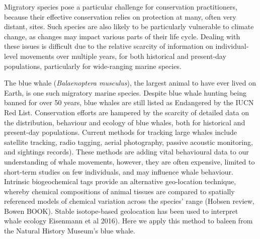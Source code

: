 \documentclass[a4paper,12pt]{article}
\begin{document}
Migratory species pose a particular challenge for conservation practitioners, because their effective conservation relies on protection at many, often very distant, sites\cite{runge2014conserving}. 
Such species are also likely to be particularly vulnerable to climate change, as changes may impact various parts of their life cycle\cite{robinson2009travelling}. 
Dealing with these issues is difficult due to the relative scarcity of information on individual-level movements over multiple years, for both historical and present-day populations, particularly for wide-ranging marine species\cite{ryan2013stable,hall2005stable,bailey2009behavioural}. 
 
The blue whale (\textit{Balaenoptera musculus}), the largest animal to have ever lived on Earth, is one such migratory marine species. 
Despite blue whale hunting being banned for over 50 years, blue whales are still listed as Endangered by the IUCN Red List\cite{reilly2008balaenoptera}.
Conservation efforts are hampered by the scarcity of detailed data on the distribution, behaviour and ecology of blue whales, both for historical and present-day populations. 
Current methods for tracking large whales include satellite tracking, radio tagging, aerial photography, passive acoustic monitoring, and sightings records\cite{borger15,mcdonald2006biogeographic,bailey2009behavioural,mate2007evolution}). 
These methods are adding vital behavioural data to our understanding of whale movements, however, they are often expensive, limited to short-term studies on few individuals\cite{bailey2009behavioural,best2015tag,mate2007evolution}, and may influence whale behaviour\cite{walker2012review}. 
Intrinsic biogeochemical tags provide an alternative geo-location technique, whereby chemical compositions of animal tissues are compared to spatially referenced models of chemical variation across the species’ range (Hobsen review, Bowen BOOK). 
Stable isotope-based geolocation has been used to interpret whale ecology \cite{hobson1998stable,ryan2013stable} Eisenmann et al 2016). 
Here we apply this method to baleen from the Natural History Museum's blue whale.
 
\end{document}
